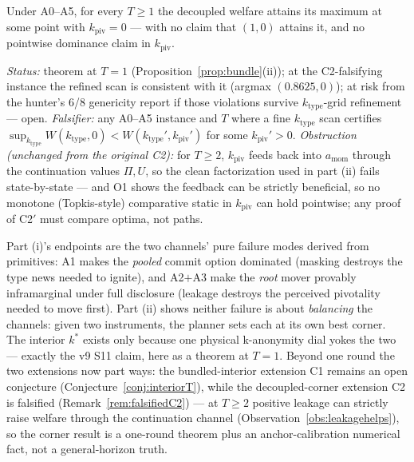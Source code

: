 \begin{restatedconjecture}
Under A0--A5, for every $T\ge 1$ the decoupled welfare attains its maximum at some point with
$k_{\mathrm{piv}}=0$ --- with no claim that $(1,0)$ attains it, and no pointwise dominance
claim in $k_{\mathrm{piv}}$.
\end{restatedconjecture}

\emph{Status:} theorem at $T=1$ (Proposition~\ref{prop:bundle}(ii)); at the C2-falsifying
instance the refined scan is consistent with it (argmax $(0.8625,0)$); at risk from the
hunter's 6/8 genericity report if those violations survive $k_{\mathrm{type}}$-grid
refinement --- open. \emph{Falsifier:} any A0--A5 instance and $T$ where a fine
$k_{\mathrm{type}}$ scan certifies
$\sup_{k_{\mathrm{type}}}W(k_{\mathrm{type}},0)<W(k_{\mathrm{type}}',k_{\mathrm{piv}}')$ for
some $k_{\mathrm{piv}}'>0$. \emph{Obstruction (unchanged from the original C2):} for $T\ge 2$,
$k_{\mathrm{piv}}$ feeds back into $a_{\mathrm{mom}}$ through the continuation values
$\Pi,U$, so the clean factorization used in part (ii) fails state-by-state --- and O1 shows
the feedback can be strictly beneficial, so no monotone (Topkis-style) comparative static in
$k_{\mathrm{piv}}$ can hold pointwise; any proof of C2$'$ must compare optima, not paths.

\begin{remark}[R5 --- reading]\label{rem:reading}
Part (i)'s endpoints are the two channels' pure failure modes derived from primitives: A1
makes the \emph{pooled} commit option dominated (masking destroys the type news needed to
ignite), and A2$+$A3 make the \emph{root} mover provably inframarginal under full disclosure
(leakage destroys the perceived pivotality needed to move first). Part (ii) shows neither
failure is about \emph{balancing} the channels: given two instruments, the planner sets each
at its own best corner. The interior $k^*$ exists only because one physical k-anonymity dial
yokes the two --- exactly the v9 S11 claim, here as a theorem at $T=1$. Beyond one round the
two extensions now part ways: the bundled-interior extension C1 remains an open conjecture
(Conjecture~\ref{conj:interiorT}), while the decoupled-corner extension C2 is falsified
(Remark~\ref{rem:falsifiedC2}) --- at $T\ge 2$ positive leakage can strictly raise welfare
through the continuation channel (Observation~\ref{obs:leakagehelps}), so the corner result
is a one-round theorem plus an anchor-calibration numerical fact, not a general-horizon
truth.
\end{remark}
